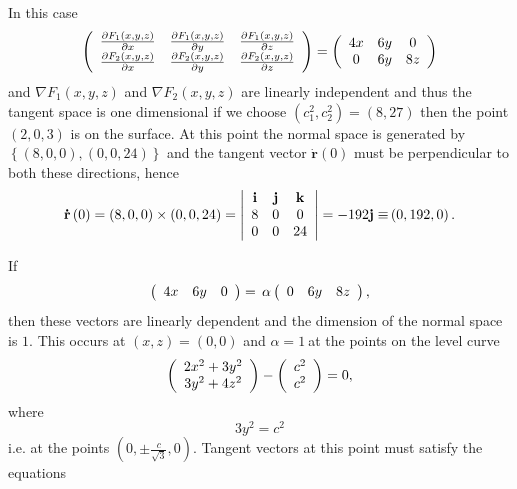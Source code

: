 \documentclass[aps,preprint]{revtex4}%
\begin{document}
In this case
\begin{equation}
\left(
\begin{array}
[c]{ccc}%
\frac{\partial F_{1}\left(  x,y,z\right)  }{\partial x} & \frac{\partial
F_{1}\left(  x,y,z\right)  }{\partial y} & \frac{\partial F_{1}\left(
x,y,z\right)  }{\partial z}\\
\frac{\partial F_{2}\left(  x,y,z\right)  }{\partial x} & \frac{\partial
F_{2}\left(  x,y,z\right)  }{\partial y} & \frac{\partial F_{2}\left(
x,y,z\right)  }{\partial z}%
\end{array}
\right)  =\left(
\begin{array}
[c]{ccc}%
4x & 6y & 0\\
0 & 6y & 8z
\end{array}
\right)
\end{equation}
and $\nabla F_{1}\left(  x,y,z\right)  $ and $\nabla F_{2}\left(
x,y,z\right)  $ are linearly independent and thus the tangent space is one
dimensional if we choose $\left(  c_{1}^{2},c_{2}^{2}\right)  =\left(
8,27\right)  $ then the point $\left(  2,0,3\right)  $ is on the surface. At
this point the normal space is generated by $\left\{  \left(  8,0,0\right)
,\left(  0,0,24\right)  \right\}  $ and the tangent vector $\mathbf{\dot{r}%
}\left(  0\right)  $ must be perpendicular to both these directions, hence
\begin{equation}
\mathbf{\dot{r}}\left(  0\right)  =\left(  8,0,0\right)  \times\left(
0,0,24\right)  =\left\vert
\begin{array}
[c]{ccc}%
\mathbf{i} & \mathbf{j} & \mathbf{k}\\
8 & 0 & 0\\
0 & 0 & 24
\end{array}
\right\vert =-192\mathbf{j\equiv}\left(  0,192,0\right)  .
\end{equation}


If
\begin{equation}
\left(
\begin{array}
[c]{ccc}%
4x & 6y & 0
\end{array}
\right)  =\,\alpha\left(
\begin{array}
[c]{ccc}%
0 & 6y & 8z
\end{array}
\right)  ,
\end{equation}
then these vectors are linearly dependent and the dimension of the normal
space is $1.$ This occurs at $\left(  x,z\right)  =\left(  0,0\right)  $ and
$\alpha=1\ $at the points on the level curve
\begin{equation}
\left(
\begin{array}
[c]{c}%
2x^{2}+3y^{2}\\
3y^{2}+4z^{2}%
\end{array}
\right)  -\left(
\begin{array}
[c]{c}%
c^{2}\\
c^{2}%
\end{array}
\right)  =0,
\end{equation}
where
\begin{equation}
3y^{2}=c^{2}%
\end{equation}
i.e. at the points $\left(  0,\pm\frac{c}{\sqrt{3}},0\right)  .$ Tangent
vectors at this point must satisfy the equations%
\end{document}
